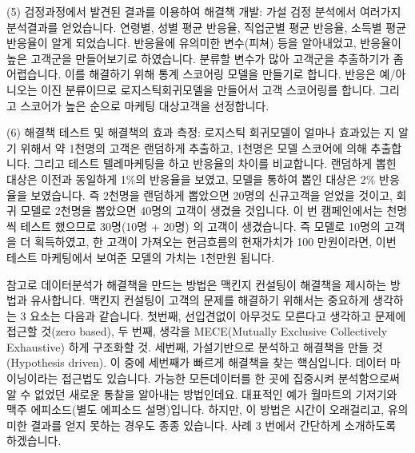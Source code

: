 \documentclass[letterpaper,10pt,english]{jupyterBook}
\begin{document}
\sphinxAtStartPar
(5) 검정과정에서 발견된 결과를 이용하여 해결책 개발: 가설 검정 분석에서 여러가지 분석결과를 얻었습니다. 연령별, 성별 평균 반응율, 직업군별 평균 반응율, 소득별 평균 반응율이 알게 되었습니다. 반응율에 유의미한 변수(피쳐) 등을 알아내었고, 반응율이 높은 고객군을 만들어보기로 하였습니다. 분류할 변수가 많아 고객군을 추출하기가 좀 어렵습니다. 이를 해결하기 위해 통계 스코어링 모델을 만들기로 합니다. 반응은 예/아니오는 이진 분류이므로 로지스틱회귀모델을 만들어서 고객 스코어링를 합니다. 그리고 스코어가 높은 순으로 마케팅 대상고객을 선정합니다.

\sphinxAtStartPar
(6) 해결책 테스트 및 해결책의 효과 측정: 로지스틱 회귀모델이 얼마나 효과있는 지 알기 위해서 약 1천명의 고객은 랜덤하게 추출하고, 1천명은 모델 스코어에 의해 추출합니다. 그리고 테스트 텔레마케팅을 하고 반응율의 차이를 비교합니다. 랜덤하게 뽑힌 대상은 이전과 동일하게 1\%의 반응율을 보였고, 모델을 통하여 뽑인 대상은 2\% 반응율을 보였습니다. 즉 2천명을 랜덤하게 뽑았으면 20명의 신규고객을 얻었을 것이고, 회귀 모델로 2천명을 뽑았으면 40명의 고객이 생겼을 것입니다. 이 번 캠페인에서는 천명씩 테스트 했으므로 30명(10명 + 20명) 의 고객이 생겼습니다. 즉 모델로 10명의 고객을 더 획득하였고, 한 고객이 가져오는 현금흐름의 현재가치가 100 만원이라면, 이번 테스트 마케팅에서 보여준 모델의 가치는 1천만원 됩니다.

\sphinxAtStartPar
참고로 데이터분석가 해결책을 만드는 방법은 맥킨지 컨설팅이 해결책을 제시하는 방법과 유사합니다. 맥킨지 컨설팅이 고객의 문제를 해결하기 위해서는 중요하게 생각하는 3 요소는 다음과 같습니다. 첫번째, 선입견없이 아무것도 모른다고 생각하고 문제에 접근할 것(zero based), 두 번째, 생각을 MECE(Mutually Exclusive Collectively Exhaustive) 하게 구조화할 것. 세번째, 가설기반으로 분석하고 해결책을 만들 것(Hypothesis driven). 이 중에 세번째가 빠르게 해결책을 찾는 핵심입니다. 데이터 마이닝이라는 접근법도 있습니다. 가능한 모든데이터를 한 곳에 집중시켜 분석함으로써 알 수 없었던 새로운 통찰을 알아내는 방법인데요. 대표적인 예가 월마트의 기저기와 맥주 에피소드(별도 에피소드 설명)입니다. 하지만, 이 방법은 시간이 오래걸리고, 유의미한 결과를 얻지 못하는 경우도 종종 있습니다. 사례 3 번에서 간단하게 소개하도록 하겠습니다.
\end{document}
